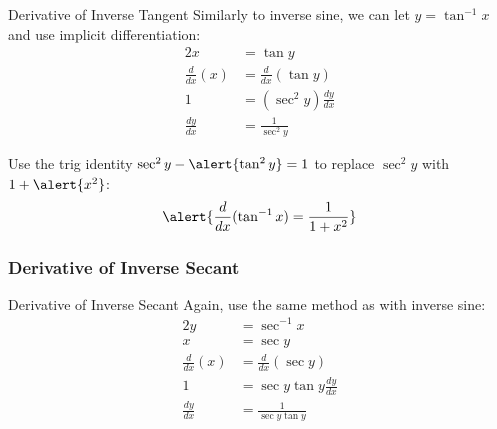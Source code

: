 \documentclass[cal1spr16Lectures.tex]{subfiles}
\begin{document}
\begin{frame}{\small Derivative of Inverse Tangent}\footnotesize
Similarly to inverse sine, we can let $y=\tan^{-1}x$ and use implicit differentiation:
\vspace{-0.5pc}
\begin{alignat*}{2}
x &= \tan y \\
\frac{d}{dx}(x) &= \frac{d}{dx} (\tan y) \\
1 &= (\sec^2 y) \frac{dy}{dx} \\
\frac{dy}{dx} &= \frac{1}{\sec^2 y}
\end{alignat*}
\end{frame}

\begin{frame}
Use the trig identity $\sec^2 y-\alert{\tan^2 y}=1$ to replace $\sec^2 y$ with $1+\alert{x^2}$:
\[\alert{\frac{d}{dx}(\tan^{-1} x)=\frac{1}{1+x^2}}\]
\end{frame}

\subsubsection{Derivative of Inverse Secant}

\begin{frame}{\small Derivative of Inverse Secant}\footnotesize
Again, use the same method as with inverse sine:
\begin{alignat*}{2}
y &= \sec^{-1}x \\
x &= \sec y \\
\frac{d}{dx}(x) &= \frac{d}{dx} (\sec y) \\
1 &= \sec y \tan y \frac{dy}{dx} \\
\frac{dy}{dx} &= \frac{1}{\sec y \tan y}
\end{alignat*}
\end{frame}
\end{document}
